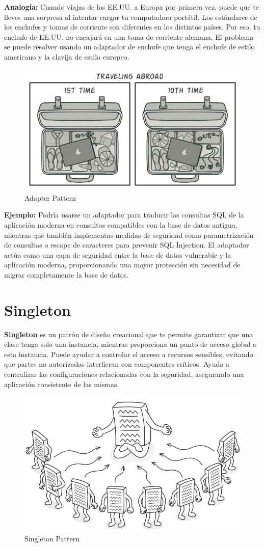 \textbf{Analogía: }Cuando viajas de los EE.UU. a Europa por primera vez, puede que te lleves una sorpresa al intentar cargar tu computadora portátil. Los estándares de los enchufes y tomas de corriente son diferentes en los distintos países. Por eso, tu enchufe de EE.UU. no encajará en una toma de corriente alemana. El problema se puede resolver usando un adaptador de enchufe que tenga el enchufe de estilo americano y la clavija de estilo europeo.

\begin{figure}[H]
    \centering
    \includegraphics[width=0.5\linewidth]{PatronesSoftware/adapter.png}
    \caption{Adapter Pattern}
    \label{fig:adapter-pattern}
\end{figure}

\textbf{Ejemplo:} Podría usarse un adaptador para traducir las consultas SQL de la aplicación moderna en consultas compatibles con la base de datos antigua, mientras que también implementas medidas de seguridad como parametrización de consultas o escape de caracteres para prevenir SQL Injection. El adaptador actúa como una capa de seguridad entre la base de datos vulnerable y la aplicación moderna, proporcionando una mayor protección sin necesidad de migrar completamente la base de datos.

\section{Singleton}

\textbf{Singleton} es un patrón de diseño creacional que te permite garantizar que una clase tenga solo una instancia, mientras proporciona un punto de acceso global a esta instancia. Puede ayudar a controlar el acceso a recursos sensibles, evitando que partes no autorizadas interfieran con componentes críticos. Ayuda a centralizar las configuraciones relacionadas con la seguridad, asegurando una aplicación consistente de las mismas. 

\begin{figure}[H]
    \centering
    \includegraphics[width=0.5\linewidth]{PatronesSoftware/singleton.png}
    \caption{Singleton Pattern}
    \label{fig:singleton-pattern}
\end{figure}


